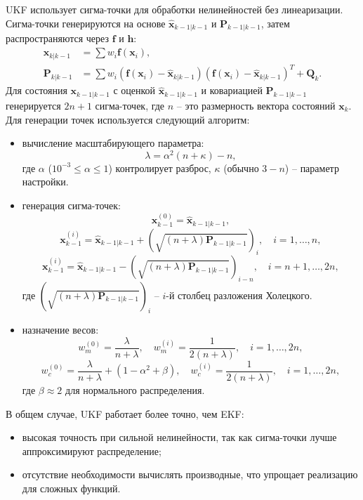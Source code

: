 {UKF использует сигма-точки для обработки нелинейностей без линеаризации. Сигма-точки генерируются на основе \(\hat{\mathbf{x}}_{k-1|k-1}\) и \(\mathbf{P}_{k-1|k-1}\), затем распространяются через \(\mathbf{f}\) и \(\mathbf{h}\):
\begin{align}
    \hat{\mathbf{x}}_{k|k-1} &= \sum w_i \mathbf{f}(\mathbf{x}_i), \\
    \mathbf{P}_{k|k-1} &= \sum w_i (\mathbf{f}(\mathbf{x}_i) - \hat{\mathbf{x}}_{k|k-1})(\mathbf{f}(\mathbf{x}_i) - \hat{\mathbf{x}}_{k|k-1})^T + \mathbf{Q}_k.
\end{align}
Для состояния \(\mathbf{x}_{k-1|k-1}\) с оценкой 
\(\hat{\mathbf{x}}_{k-1|k-1}\) и ковариацией \(\mathbf{P}_{k-1|k-1}\) 
генерируется \(2n + 1\) сигма-точек, где \(n\)  -- это размерность вектора состояний \(\mathbf{x}_k\).
Для генерации точек используется следующий алгоритм:

\begin{itemize}
    \item вычисление масштабирующего параметра:
    \[
    \lambda = \alpha^2 (n + \kappa) - n,
    \]
    где \(\alpha\) (\(10^{-3} \leq \alpha \leq 1\)) контролирует разброс, \(\kappa\) (обычно \(3 - n\)) -- параметр настройки.
    \item генерация сигма-точек:
    \[
    \mathbf{x}_{k-1}^{(0)} = \hat{\mathbf{x}}_{k-1|k-1},
    \]
    \[
    \mathbf{x}_{k-1}^{(i)} = \hat{\mathbf{x}}_{k-1|k-1} + (\sqrt{(n + \lambda) \mathbf{P}_{k-1|k-1}})_i, \quad i = 1, \dots, n,
    \]
    \[
    \mathbf{x}_{k-1}^{(i)} = \hat{\mathbf{x}}_{k-1|k-1} - (\sqrt{(n + \lambda) \mathbf{P}_{k-1|k-1}})_{i-n}, \quad i = n+1, \dots, 2n,
    \]
    где \((\sqrt{(n + \lambda) \mathbf{P}_{k-1|k-1}})_i\) -- \(i\)-й столбец разложения Холецкого.
    \item назначение весов:
    \[
    w_m^{(0)} = \frac{\lambda}{n + \lambda}, \quad w_m^{(i)} = \frac{1}{2(n + \lambda)}, \quad i = 1, \dots, 2n,
    \]
    \[
    w_c^{(0)} = \frac{\lambda}{n + \lambda} + (1 - \alpha^2 + \beta), \quad w_c^{(i)} = \frac{1}{2(n + \lambda)}, \quad i = 1, \dots, 2n,
    \]
    где \(\beta \approx 2\) для нормального распределения.
\end{itemize}

В общем случае, UKF работает более точно, чем EKF:
\begin{itemize}
    \item высокая точность при сильной нелинейности, так как сигма-точки лучше аппроксимируют распределение;
    \item отсутствие необходимости вычислять производные, что упрощает реализацию для сложных функций.
\end{itemize}

}

